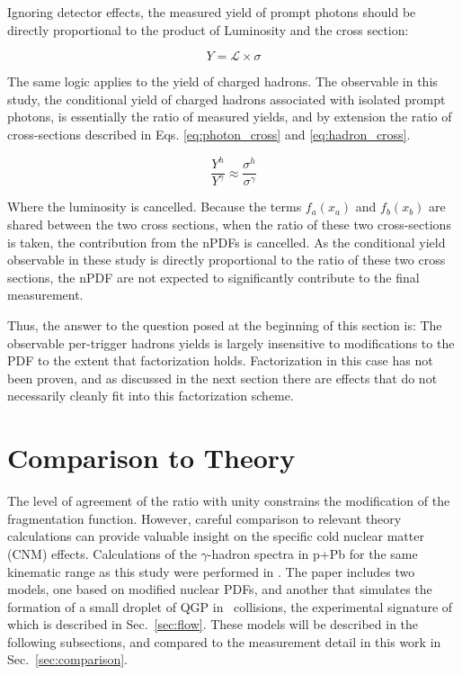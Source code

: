 {Ignoring detector effects, the measured yield of prompt photons should be directly proportional to the product of Luminosity and the cross section:

\begin{equation}
  Y = \mathcal{L}\times\sigma
\end{equation}

The same logic applies to the yield of charged hadrons. The observable in this study, the conditional yield of charged hadrons associated with isolated prompt photons, is essentially the ratio of measured yields, and by extension the ratio of cross-sections described in Eqs. \ref{eq:photon_cross} and \ref{eq:hadron_cross}. 

\begin{equation}
  \frac{Y^h}{Y^\gamma} \approx \frac{\sigma^h}{\sigma^\gamma}
  \label{eq:yield_ratios}
\end{equation}

Where the luminosity is cancelled. Because the terms $f_{a}(x_a)$ and $f_{b}(x_b)$ are shared between the two cross sections, when the ratio of these two cross-sections is taken, the contribution from the nPDFs is cancelled. As the conditional yield observable in these study is directly proportional to the ratio of these two cross sections, the nPDF are not expected to significantly contribute to the final measurement.

Thus, the answer to the question posed at the beginning of this section is: The observable per-trigger hadrons yields is largely insensitive to modifications to the PDF  to the extent that factorization holds. Factorization in this case has not been proven, and as discussed in the next section there are effects that do not necessarily cleanly fit into this factorization scheme.

\section{Comparison to Theory}
The  level of agreement of the ratio with unity constrains the modification of the fragmentation function. However, careful comparison to relevant theory calculations can provide valuable insight on the specific cold nuclear matter (CNM) effects. Calculations of the $\gamma$-hadron spectra in p+Pb for the same kinematic range as this study were performed in \cite{Xie2021}. The paper includes two models, one based on modified nuclear PDFs, and another that simulates the formation of a small droplet of QGP in \pPb~collisions, the experimental signature of which is described in Sec.~\ref{sec:flow}. These models will be described in the following subsections, and compared to the measurement detail in this work in Sec.~\ref{sec:comparison}.

}
